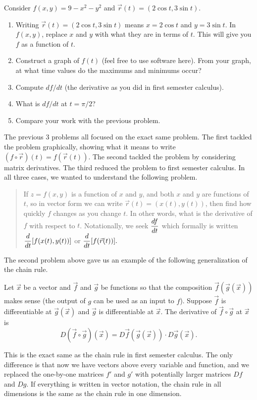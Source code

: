 \begin{problem}
 Consider $f(x,y)=9-x^2-y^2$ and $\vec r(t)=(2\cos t, 3\sin t)$.
\begin{enumerate}
 \item Writing $\vec r(t)=(2\cos t, 3\sin t)$ means $x=2\cos t$ and $y=3\sin t$. In $f(x,y)$, replace $x$ and $y$ with what they are in terms of $t$. This will give you $f$ as a function of $t$. 
 \item Construct a graph of $f(t)$ (feel free to use software here). From your graph, at what time values do the maximums and minimums occur?
 \item Compute $df/dt$ (the derivative as you did in first semester calculus).
 \item What is $df/dt$ at $t=\pi/2$?
 \item Compare your work with the previous problem.
\end{enumerate}
\end{problem}

The previous 3 problems all focused on the exact same problem.  The first tackled the problem graphically, showing  what it means to write $(f\circ \vec r)(t)=f(\vec r(t))$. The second tackled the problem by considering matrix derivatives.  The third reduced the problem to first semester calculus.  In all three cases, we wanted to understand the following problem.
\begin{quote}
 If $z=f(x,y)$ is a function of $x$ and $y$, and both $x$ and $y$ are functions of $t$, so in vector form we can write $\vec r(t)=(x(t),y(t))$, then find how quickly $f$ changes as you change $t$. In other words, what is the derivative of $f$ with respect to $t$. Notationally, we seek $\displaystyle \frac{df}{dt}$ which formally is written $\displaystyle \frac{d}{dt}[f(x(t),y(t))]$ or $\displaystyle \frac{d}{dt} [f(\vec r(t))].$
\end{quote}
The second problem above gave us an example of the following generalization of the chain rule.
\begin{theorem}
 Let $\vec x$ be a vector and $\vec f$ and $\vec g$ be functions so that the composition $\vec f(\vec g(\vec x))$ makes sense (the output of $g$ can be used as an input to $f$). Suppose $\vec f$ is differentiable at $\vec g(\vec x)$ and $\vec g$ is differentiable at $\vec x$. The derivative of $\vec f\circ \vec g$ at $\vec x$ is 
$$D(\vec f\circ \vec g)(\vec x) = D\vec f(\vec g(\vec x))\cdot D\vec g(\vec x).$$
\end{theorem}
This is the exact same as the chain rule in first semester calculus.  The only difference is that now we have vectors above every variable and function, and we replaced the one-by-one matrices $f'$ and $g'$ with potentially larger matrices $Df$ and $Dg$. If everything is written in vector notation, the chain rule in all dimensions is the same as the chain rule in one dimension.

